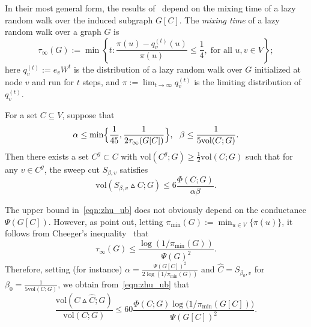 \documentclass[11pt,twoside]{article}
\newcommand{\set}[1]{\left\{#1\right\}}
\newcommand{\1}{\mathbf{1}}
\newcommand{\wh}[1]{\widehat{#1}}
\newcommand{\vol}{\mathrm{vol}}
\begin{document}
In their most general form, the results of~\citet{zhu2013} depend on the mixing time of a lazy random walk over the induced subgraph $G[C]$. The \emph{mixing time} of a lazy random walk over a graph $G$ is
\begin{equation}
\label{eqn:mixing_time}
\tau_{\infty}(G) := \min\set{ t: \frac{{\pi}(u) - {q}_{v}^{(t)}(u)}
	{{\pi}(u)} \leq \frac{1}{4}, \; \text{for all $u,v \in V$}};
\end{equation}
here $q_v^{(t)} := e_v W^t$ is the distribution of a lazy random walk over $G$ initialized at node $v$ and run for $t$ steps, and $\pi := \lim_{t \to \infty} q_v^{(t)}$ is the limiting distribution of $q_v^{(t)}$.
\begin{lemma}
	\label{lem:zhu}
	For a set $C \subseteq V$, suppose that
	\begin{equation}
	\label{eqn:zhu_condition}
	\alpha \leq \min\Bigl\{\frac{1}{45}, \frac{1}{2\tau_{\infty}(G[C])}\Bigr\},~~ \beta \leq \frac{1}{5\vol(C;G)}.
	\end{equation}
	Then there exists a set $C^g \subset C$ with $\vol(C^g;G) \geq \frac{1}{2}\vol(C;G)$ such that for any $v \in C^g$, the sweep cut $S_{\beta,v}$ satisfies
	\begin{equation}
	\label{eqn:zhu_ub}
	\vol(S_{\beta,v} \vartriangle C;G) \leq 6\frac{\Phi(C;G)}{\alpha \beta}.
	\end{equation}
\end{lemma}
The upper bound in~\eqref{eqn:zhu_ub} does not obviously depend on the conductance $\Psi(G[C])$. However, as \cite{zhu2013} point out, letting $\pi_{\min}(G) := \min_{u \in V}\{\pi(u)\}$, it follows from Cheeger's inequality~\citep{chung1997} that 
\begin{equation}
\label{eqn:mixing_time_cheeger}
\tau_{\infty}(G) \leq \frac{\log(1/\pi_{\min}(G))}{\Psi(G)^2}.
\end{equation}
Therefore, setting (for instance) $\alpha = \frac{\Psi(G[C])^2}{2\log(1/\pi_{\min}(G))}$ and $\wh{C} = S_{\beta_0,v}$ for $\beta_0 = \frac{1}{5 \vol(C;G)}$, we obtain from~\eqref{eqn:zhu_ub} that 
\begin{equation}
\label{eqn:zhu_ub2}
\frac{\vol(C \vartriangle \wh{C};G)}{\vol(C; G)} \leq 60\frac{\Phi(C;G) \log\bigl( 1/\pi_{\min}(G[C])\bigr)}{\Psi(G[C])^2}.
\end{equation}
\end{document}
